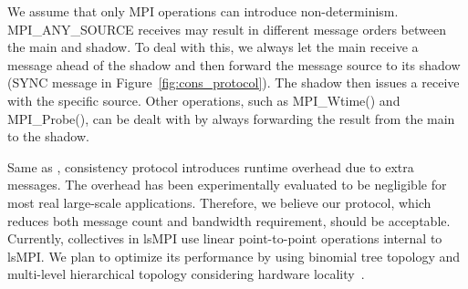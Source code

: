 We assume that only MPI operations can introduce non-determinism. MPI\_ANY\_SOURCE receives may result in different message orders between the main and shadow. To deal with this, we always let the main receive a message ahead of the shadow and then forward the message source to its shadow (SYNC message in Figure~\ref{fig:cons_protocol}). The shadow then issues a receive with the specific source. Other operations, such as MPI\_Wtime() and MPI\_Probe(), can be dealt with by always forwarding the result from the main to the shadow.

Same as \cite{engelmann2011redundant,ferreira_sc_2011}, consistency protocol introduces runtime overhead due to extra messages. The overhead has been experimentally evaluated to be negligible for most real large-scale applications. Therefore, we believe our protocol, which reduces both message count and bandwidth requirement, should be acceptable. Currently, collectives in lsMPI use linear point-to-point operations internal to lsMPI. We plan to optimize its performance by using binomial tree topology and multi-level hierarchical topology considering hardware locality~\cite{herault2015practical}.




